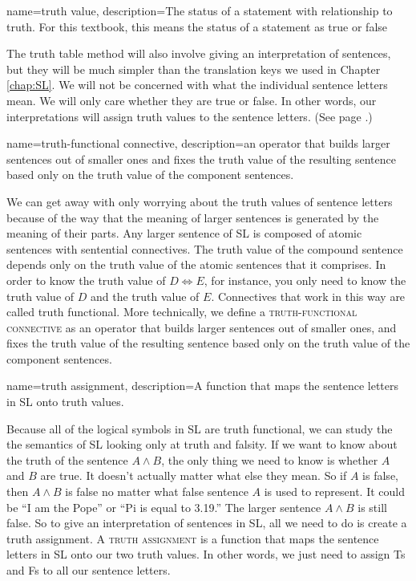 {
  name=truth value,
  description={The status of a statement with relationship to truth. For  this textbook, this means the status of a statement as true or false}
}

The truth table method will also involve giving an interpretation of sentences, but they will be much simpler than the translation keys we used in Chapter \ref{chap:SL}. We will not be concerned with what the individual sentence letters mean. We will only care whether they are true or false. In other words, our interpretations will assign \glspl{truth value} to the sentence letters. (See page \pageref{def:Truth_value}.)

{
name=truth-functional connective,
description={an operator that builds larger sentences out of smaller ones and fixes the truth value of the resulting sentence based only on the truth value of the component sentences.}
}

We can get away with only worrying about the truth values of sentence letters because of the way that the meaning of larger sentences is generated by the meaning of their parts. Any larger sentence of SL is composed of atomic sentences with sentential connectives. The truth value of the compound sentence depends only on the truth value of the atomic sentences that it comprises. In order to know the truth value of $D\iff E$, for instance, you only need to know the truth value of $D$ and the truth value of $E$. Connectives that work in this way are called truth functional. More technically, we define a \textsc{\gls{truth-functional connective}} \label{def:truth-functional_connective}as an operator that builds larger sentences out of smaller ones, and fixes the truth value of the resulting sentence based only on the truth value of the component sentences.

{
name=truth assignment,
description={A function that maps the sentence letters in SL onto truth values.}
}

Because all of the logical symbols in SL are truth functional, we can study the the semantics of SL looking only at truth and falsity. If we want to know about the truth of the sentence $A \land B$, the only thing we need to know is whether $A$ and $B$ are true. It doesn't actually matter what else they mean. So if $A$ is false, then $A \land B$ is false no matter what false sentence $A$ is used to represent. It could be ``I am the Pope'' or ``Pi is equal to 3.19.'' The larger sentence $A \land B$ is still false. So to give an interpretation of sentences in SL, all we need to do is create a truth assignment. A \textsc{\gls{truth assignment}} \label{def:truth_assignment} is a function that maps the sentence letters in SL onto our two truth values. In other words, we just need to assign Ts and Fs to all our sentence letters.

